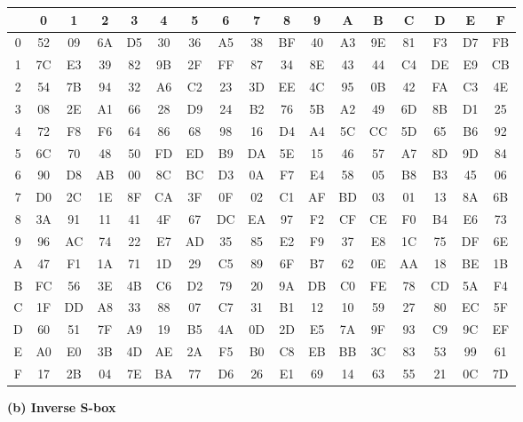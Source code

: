 \documentclass[11pt]{article}
\begin{document}
	\begin{tabular}{| c | c | c | c | c | c | c | c | c | c | c | c | c | c | c | c | c |}
		\hline 
		&0 &1  &2 &3 &4 &5 &6 &7 &8 &9 &A &B &C &D &E &F\\
		\hline
		0 &52 &09 &6A &D5 &30 &36 &A5 &38 &BF &40 &A3 &9E &81 &F3 &D7 &FB\\
		\hline
		1 &7C &E3 &39 &82 &9B &2F &FF &87 &34 &8E &43 &44 &C4 &DE &E9 &CB\\
		\hline
		2 &54 &7B &94 &32 &A6 &C2 &23 &3D &EE &4C &95 &0B &42 &FA &C3 &4E\\
		\hline
		3 &08 &2E &A1 &66 &28 &D9 &24 &B2 &76 &5B &A2 &49 &6D &8B &D1 &25\\
		\hline
		4 &72 &F8 &F6 &64 &86 &68 &98 &16 &D4 &A4 &5C &CC &5D &65 &B6 &92\\
		\hline
		5 &6C &70 &48 &50 &FD &ED &B9 &DA &5E &15 &46 &57 &A7 &8D &9D &84\\
		\hline
		6 &90 &D8 &AB &00 &8C &BC &D3 &0A &F7 &E4 &58 &05& B8& B3 &45 &06\\
		\hline
		7 &D0 &2C &1E &8F &CA &3F &0F &02 &C1 &AF &BD &03 &01 &13 &8A &6B\\
		\hline
		8 &3A &91 &11 &41 &4F &67 &DC &EA &97 &F2 &CF &CE &F0 &B4 &E6 &73\\
		\hline
		9 &96 &AC &74 &22 &E7 &AD &35 &85 &E2 &F9 &37 &E8 &1C &75 &DF &6E\\
		\hline
		A &47 &F1 &1A &71 &1D &29 &C5 &89 &6F &B7 &62 &0E &AA &18 &BE &1B\\
		\hline
		B &FC &56 &3E &4B &C6 &D2 &79 &20 &9A &DB &C0 &FE &78 &CD &5A &F4\\
		\hline
		C &1F &DD &A8 &33 &88 &07 &C7 &31 &B1 &12 &10 &59 &27 &80 &EC &5F\\
		\hline
		D &60 &51 &7F &A9 &19 &B5 &4A &0D &2D &E5 &7A &9F &93 &C9 &9C &EF\\
		\hline
		E &A0 &E0 &3B &4D &AE &2A &F5 &B0 &C8& EB &BB &3C &83 &53 &99 &61\\
		\hline
		F &17 &2B &04& 7E &BA &77 &D6 &26 &E1 &69 &14 &63 &55 &21 &0C &7D\\
		\hline
	\end{tabular}\vspace{0.1cm}
	\centering\textbf{(b) Inverse S-box}\flushleft
\end{document}
